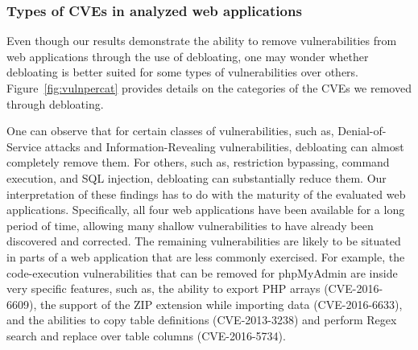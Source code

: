 \subsubsection{Types of CVEs in analyzed web applications}

Even though our results demonstrate the ability to remove vulnerabilities
from web applications through the use of debloating, one may wonder
whether debloating is better suited for some types of vulnerabilities over
others. Figure~\ref{fig:vulnpercat} provides details on the categories of
the CVEs we removed through debloating.


One can observe that for certain classes of vulnerabilities, such as,
Denial-of-Service attacks and Information-Revealing vulnerabilities,
debloating can almost completely remove them.
For others, such as, restriction bypassing, command execution, and
SQL injection, debloating can substantially reduce them.
Our interpretation of these findings has to do with the maturity of
the evaluated web applications. Specifically, all four web applications
have been available for a long period of time, allowing many shallow
vulnerabilities to have already been discovered and corrected. The remaining
vulnerabilities are likely to be situated in parts of a web application that
are less commonly exercised. For example, the code-execution vulnerabilities
that can be removed for phpMyAdmin are inside very specific features, such as,
the ability to export PHP arrays (CVE-2016-6609), the support of the
ZIP extension while importing data (CVE-2016-6633), and the abilities
to copy table definitions (CVE-2013-3238) and perform Regex search and replace over table columns
(CVE-2016-5734).

